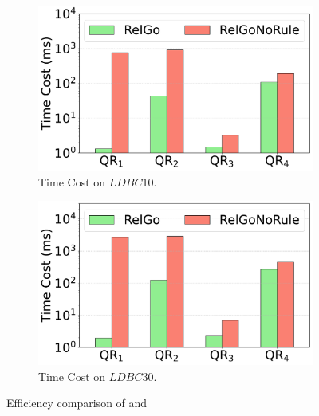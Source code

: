 \begin{figure}[t]
    \vspace{-1.4em}
    \centering
    \begin{subfigure}[b]{.45\linewidth}
        \centering
        \includegraphics[width=\linewidth]{./figures/exp/filter_sf10.pdf}
        \vspace{-2em}
        \caption{Time Cost on $LDBC10$.}
        \label{fig:exp-filter-sf10}
    \end{subfigure}
    \begin{subfigure}[b]{0.45\linewidth}
        \centering
        \includegraphics[width=\linewidth]{./figures/exp/filter_sf30.pdf}
        \vspace{-2em}
        \caption{Time Cost on $LDBC30$.}
        \label{fig:exp-filter-sf30}
    \end{subfigure}
    \caption{Efficiency comparison of \name and \relgonofi}
    \label{fig:exp-filter}
\end{figure}

